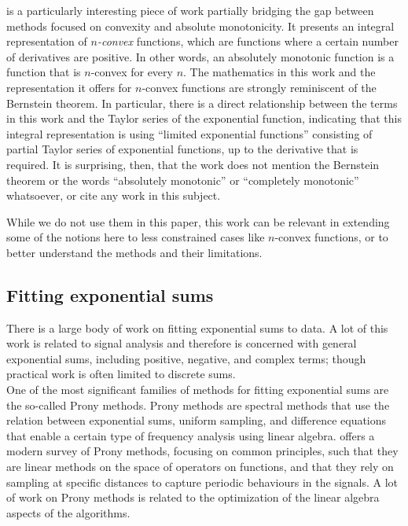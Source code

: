 \documentclass[12pt,a4paper]{article}
\begin{document}
\cite{2011_rajba_integral_representation_convex_functions} is a particularly interesting piece of work partially bridging the gap between methods focused on convexity and absolute monotonicity. It presents an integral representation of {\emph{$n$-convex}} functions, which are functions where a certain number of derivatives are positive. In other words, an absolutely monotonic function is a function that is $n$-convex for every $n$. The mathematics in this work and the representation it offers for $n$-convex functions are strongly reminiscent of the Bernstein theorem. In particular, there is a direct relationship between the terms in this work and the Taylor series of the exponential function, indicating that this integral representation is using ``limited exponential functions'' consisting of partial Taylor series of exponential functions, up to the derivative that is required. It is surprising, then, that the work does not mention the Bernstein theorem or the words ``absolutely monotonic'' or ``completely monotonic'' whatsoever, or cite any work in this subject.

While we do not use them in this paper, this work can be relevant in extending some of the notions here to less constrained cases like $n$-convex functions, or to better understand the methods and their limitations.\\

\subsection{Fitting exponential sums}
\label{exponential_sums}

There is a large body of work on fitting exponential sums to data. A lot of this work is related to signal analysis and therefore is concerned with general exponential sums, including positive, negative, and complex terms; though practical work is often limited to discrete sums.\\ 

One of the most significant families of methods for fitting exponential sums are the so-called Prony methods. Prony methods are spectral methods that use the relation between exponential sums, uniform sampling, and difference equations that enable a certain type of frequency analysis using linear algebra. \cite{2021_keller_prony_methods} offers a modern survey of Prony methods, focusing on common principles, such that they are linear methods on the space of operators on functions, and that they rely on sampling at specific distances to capture periodic behaviours in the signals. A lot of work on Prony methods is related to the optimization of the linear algebra aspects of the algorithms.
\end{document}
